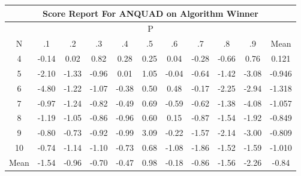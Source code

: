 \documentclass[11pt,a4paper]{report}
\begin{document}
\begin{longtable}{ | c || c | c | c | c | c | c | c | c | c || c |}
\hline
\multicolumn{11}{|c|}{ Score Report For ANQUAD on Algorithm Winner} \\
\hline
\multicolumn{11}{|c|}{ P } \\
\hline
N & .1 & .2 & .3 & .4 & .5 & .6 & .7 & .8 & .9 & Mean\\
 \hline
 \hline
 \endhead
  4 &  \cellcolor[HTML]{FFFFFF} -0.14 &  \cellcolor[HTML]{FFFFFF} 0.02 &  \cellcolor[HTML]{E7E7FF} 0.82 &  \cellcolor[HTML]{F7F7FF} 0.28 &  \cellcolor[HTML]{F7F7FF} 0.25 &  \cellcolor[HTML]{FFFFFF} 0.04 &  \cellcolor[HTML]{FFF7F7} -0.28 &  \cellcolor[HTML]{FFEFEF} -0.66 &  \cellcolor[HTML]{EFEFFF} 0.76 & 0.121 \\
  5 &  \cellcolor[HTML]{FFC7C7} -2.10 &  \cellcolor[HTML]{FFDFDF} -1.33 &  \cellcolor[HTML]{FFE7E7} -0.96 &  \cellcolor[HTML]{FFFFFF} 0.01 &  \cellcolor[HTML]{E7E7FF} 1.05 &  \cellcolor[HTML]{FFFFFF} -0.04 &  \cellcolor[HTML]{FFEFEF} -0.64 &  \cellcolor[HTML]{FFDFDF} -1.42 &  \cellcolor[HTML]{FFAFAF} -3.08 & -0.946 \\
  6 &  \cellcolor[HTML]{FF8787} -4.80 &  \cellcolor[HTML]{FFDFDF} -1.22 &  \cellcolor[HTML]{FFE7E7} -1.07 &  \cellcolor[HTML]{FFF7F7} -0.38 &  \cellcolor[HTML]{EFEFFF} 0.50 &  \cellcolor[HTML]{EFEFFF} 0.48 &  \cellcolor[HTML]{FFF7F7} -0.17 &  \cellcolor[HTML]{FFC7C7} -2.25 &  \cellcolor[HTML]{FFB7B7} -2.94 & -1.318 \\
  7 &  \cellcolor[HTML]{FFE7E7} -0.97 &  \cellcolor[HTML]{FFDFDF} -1.24 &  \cellcolor[HTML]{FFE7E7} -0.82 &  \cellcolor[HTML]{FFEFEF} -0.49 &  \cellcolor[HTML]{EFEFFF} 0.69 &  \cellcolor[HTML]{FFEFEF} -0.59 &  \cellcolor[HTML]{FFEFEF} -0.62 &  \cellcolor[HTML]{FFDFDF} -1.38 &  \cellcolor[HTML]{FF9797} -4.08 & -1.057 \\
  8 &  \cellcolor[HTML]{FFDFDF} -1.19 &  \cellcolor[HTML]{FFE7E7} -1.05 &  \cellcolor[HTML]{FFE7E7} -0.86 &  \cellcolor[HTML]{FFE7E7} -0.96 &  \cellcolor[HTML]{EFEFFF} 0.60 &  \cellcolor[HTML]{FFFFFF} 0.15 &  \cellcolor[HTML]{FFE7E7} -0.87 &  \cellcolor[HTML]{FFD7D7} -1.54 &  \cellcolor[HTML]{FFCFCF} -1.92 & -0.849 \\
  9 &  \cellcolor[HTML]{FFE7E7} -0.80 &  \cellcolor[HTML]{FFEFEF} -0.73 &  \cellcolor[HTML]{FFE7E7} -0.92 &  \cellcolor[HTML]{FFE7E7} -0.99 &  \cellcolor[HTML]{AFAFFF} 3.09 &  \cellcolor[HTML]{FFF7F7} -0.22 &  \cellcolor[HTML]{FFD7D7} -1.57 &  \cellcolor[HTML]{FFC7C7} -2.14 &  \cellcolor[HTML]{FFB7B7} -3.00 & -0.809 \\
  10 &  \cellcolor[HTML]{FFEFEF} -0.74 &  \cellcolor[HTML]{FFDFDF} -1.14 &  \cellcolor[HTML]{FFE7E7} -1.10 &  \cellcolor[HTML]{FFEFEF} -0.73 &  \cellcolor[HTML]{EFEFFF} 0.68 &  \cellcolor[HTML]{FFE7E7} -1.08 &  \cellcolor[HTML]{FFCFCF} -1.86 &  \cellcolor[HTML]{FFD7D7} -1.52 &  \cellcolor[HTML]{FFD7D7} -1.59 & -1.010 \\
 \hline
 \hline
Mean &  \cellcolor[HTML]{FFD7D7} -1.54 &  \cellcolor[HTML]{FFE7E7} -0.96 &  \cellcolor[HTML]{FFEFEF} -0.70 &  \cellcolor[HTML]{FFF7F7} -0.47 &  \cellcolor[HTML]{E7E7FF} 0.98 &  \cellcolor[HTML]{FFF7F7} -0.18 &  \cellcolor[HTML]{FFE7E7} -0.86 &  \cellcolor[HTML]{FFD7D7} -1.56 &  \cellcolor[HTML]{FFC7C7} -2.26 &  \cellcolor[HTML]{FFE7E7} -0.84
\end{longtable}
\end{document}
